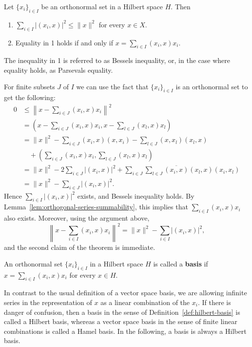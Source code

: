 \begin{Theorem}
\label{thm:bessel-parseval-orthonormal-expansion}
Let $\{x_i\}_{i\in I}$ be an orthonormal set in a Hilbert space $H$. Then\begin{enumerate}
\item $\sum_{i\in I}|(x_i,x)|^2\leq\|x\|^2$ for every $x\in X$.
\item Equality in 1 holds if and only if $x=\sum_{i\in I}(x_i,x)x_i$.
\end{enumerate}
\end{Theorem}

The inequality in 1 is referred to as Bessel\textquotesingle s inequality, or, in the case where equality holds, as Parseval\textquotesingle s equality.

\begin{Proof}
For finite subsets $J$ of $I$ we can use the fact that $\{x_i\}_{i\in I}$ is an orthonormal set to get the following:\[
\begin{aligned}
0&\leq\left\|x-\sum_{i\in J}(x_i,x)x_i\right\|^2\\
&=\left(x-\sum_{i\in J}(x_i,x)x_i,x-\sum_{l\in J}(x_l,x)x_l\right)\\
&=\|x\|^2-\sum_{i\in J}(x_i,x)(x,x_i)-\sum_{l\in J}(x,x_l)(x_l,x)\\
&\quad+\left(\sum_{i\in J}(x_i,x)x_i,\sum_{l\in J}(x_l,x)x_l\right)\\
&=\|x\|^2-2\sum_{i\in J}|(x_i,x)|^2+\sum_{i\in J}\sum_{l\in J}\overline{(x_i,x)}(x_l,x)(x_i,x_l)\\
&=\|x\|^2-\sum_{i\in J}|(x_i,x)|^2.
\end{aligned}
\]Hence $\sum_{i\in I}|(x_i,x)|^2$ exists, and Bessel\textquotesingle s inequality holds. By Lemma~\ref{lem:orthogonal-series-summability}, this implies that $\sum_{i\in I}(x_i,x)x_i$ also exists. Moreover, using the argument above,
\begin{equation}\label{eq:orthonormal-expansion-remainder-norm-identity}
\left\|x-\sum_{i\in I}(x_i,x)x_i\right\|^2=\|x\|^2-\sum_{i\in I}|(x_i,x)|^2,
\end{equation}
and the second claim of the theorem is immediate.
\end{Proof}

\begin{Definition}
\label{def:hilbert-basis}
An orthonormal set $\{x_i\}_{i\in I}$ in a Hilbert space $H$ is called a \textbf{basis} if $x=\sum_{i\in I}(x_i,x)x_i$ for every $x\in H$.
\end{Definition}

In contrast to the usual definition of a vector space basis, we are allowing infinite series in the representation of $x$ as a linear combination of the $x_i$. If there is danger of confusion, then a basis in the sense of Definition~\ref{def:hilbert-basis} is called a Hilbert basis, whereas a vector space basis in the sense of finite linear combinations is called a Hamel basis. In the following, a basis is always a Hilbert basis.
